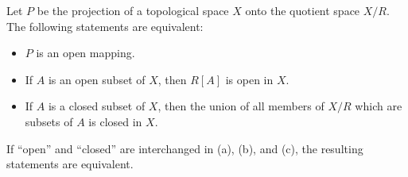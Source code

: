 Let $P$ be the projection of a topological space $X$ onto the quotient space $X/R$. The following statements are equivalent:
\begin{itemize}
  \item[(a)] $P$ is an open mapping.
  \item[(b)] If $A$ is an open subset of $X$, then $R[A]$ is open in $X$.
  \item[(c)] If $A$ is a closed subset of $X$, then the union of all members of $X/R$ which are subsets of $A$ is closed in $X$.
\end{itemize}
If ``open'' and ``closed'' are interchanged in (a), (b), and (c), the resulting statements are equivalent.
